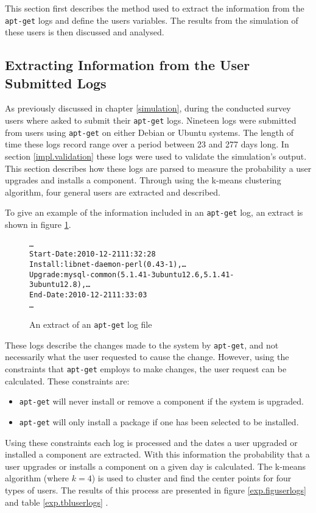 This section first describes the method used to extract the information from the \texttt{apt-get} logs and define the users variables.
The results from the simulation of these users is then discussed and analysed.

\subsection{Extracting Information from the User Submitted Logs}
As previously discussed in chapter \ref{simulation}, during the conducted survey users where asked to submit their \texttt{apt-get} logs.
Nineteen logs were submitted from users using \texttt{apt-get} on either Debian or Ubuntu systems.
The length of time these logs record range over a period between 23 and 277 days long. 
In section \ref{impl.validation} these logs were used to validate the simulation's output.
This section describes how these logs are parsed to measure the probability a user upgrades and installs a component.
Through using the k-means clustering algorithm, four general users are extracted and described.

To give an example of the information included in an \texttt{apt-get} log, an extract is shown in figure \ref{aptlog}.
\begin{figure}[htp]
\begin{center}
\begin{alltt}
\ldots
Start-Date: 2010-12-21 11:32:28
Install: libnet-daemon-perl (0.43-1), \ldots
Upgrade: mysql-common (5.1.41-3ubuntu12.6, 5.1.41-3ubuntu12.8), \ldots
End-Date: 2010-12-21 11:33:03
\ldots
\end{alltt}
\caption{An extract of an \texttt{apt-get} log file}
\label{aptlog}
\end{center}
\end{figure}

These logs describe the changes made to the system by \texttt{apt-get}, and not necessarily what the user requested to cause the change.
However, using the constraints that \texttt{apt-get} employs to make changes, the user request can be calculated.
These constraints are:
\begin{itemize}
  \item \texttt{apt-get} will never install or remove a component if the system is upgraded.
  \item \texttt{apt-get} will only install a package if one has been selected to be installed.
\end{itemize}
Using these constraints each log is processed and the dates a user upgraded or installed a component are extracted.
With this information the probability that a user upgrades or installs a component on a given day is calculated.
The k-means algorithm (where $k=4$) is used to cluster and find the center points for four types of users.
The results of this process are presented in figure \ref{exp.figuserlogs} and table \ref{exp.tbluserlogs} .

